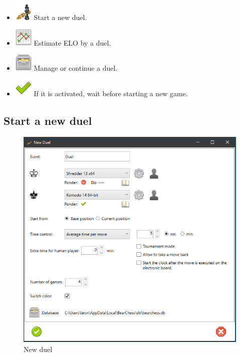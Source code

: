 \documentclass[11pt,a4paper]{article}
\begin{document}
\begin{itemize}
	\item \includegraphics[scale=0.5]{6-2-chess-png.png} Start a new duel.
	\item \includegraphics[scale=0.5]{chart_line.png} Estimate ELO by a duel.	
	\item \includegraphics[scale=0.5]{file_manager.png} Manage or continue a duel. 
	\item \includegraphics[scale=0.5]{tick.png} If it is activated, wait before starting a new game.	 
\end{itemize}

\subsection{Start a new duel}

\begin{figure}[H]
	\centering
	\includegraphics[scale=0.7]{EngineDuel2.png}
	\caption{New duel}
	\label{fig:EngineDuel2}
\end{figure}
\end{document}
